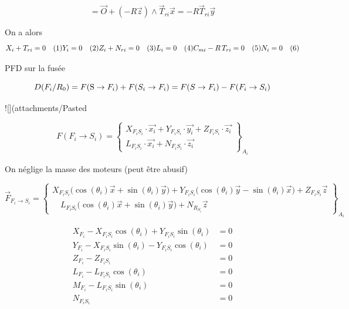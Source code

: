 \documentclass[a4paper,12pt]{report}  %
\begin{document}
$$ = \vec{O} + ({-R}\vec{z})\wedge\vec{T}_{ri}\vec{x} = -R\vec{T}_{ri}\vec{y}
$$

On a alors
$$
X_i + T_{ri} = 0 \quad (1) \\
Y_i = 0 \quad (2) \\
Z_i + N_{ri} = 0 \quad (3) \\
L_i = 0 \quad  (4) \\
C_{mi} - R\,T_{ri} = 0 \quad  (5) \\
N_i = 0 \quad  (6)
$$


PFD sur la fusée

$$
D(F_i/R_0) = {F}(\text{S}\rightarrow F_i) + {F}(S_i \rightarrow F_i) \\
= {F}(S \rightarrow F_i) - {F}(F_i \rightarrow S_i) \\
$$

![](attachments/Pasted%

$$
F(F_i \to S_i) = 
\begin{Bmatrix}
	X_{F_i S_i} \cdot \vec{x_i} + Y_{F_i S_i} \cdot \vec{y_i} + Z_{F_i S_i} \cdot \vec{z_i} \\
	L_{F_i S_i} \cdot \vec{x_i} + N_{F_i S_i} \cdot \vec{z_i}
\end{Bmatrix}_{A_{i}}
$$




On néglige la masse des moteurs (peut être abusif)


$$
\vec{F}_{F_i \to S_i} =
\left\{
\begin{array}{c}
	X_{F_iS_i} \big(\cos(\theta_i) \vec{x} + \sin(\theta_i) \vec{y} \big) 
	+  Y_{F_iS_i} \big(\cos(\theta_i) \vec{y} - \sin(\theta_i) \vec{x} \big)
	+ Z_{F_iS_i} \vec{z} \\[1em]
	\quad L_{F_iS_i} \big(\cos(\theta_i) \vec{x} + \sin(\theta_i) \vec{y} \big)  + N_{R_{S_i}} \vec{z}
\end{array}
\right\}_{A_i}
$$


\begin{align}
	X_{F_i} - X_{F_iS_i} \cos(\theta_i) + Y_{F_iS_i} \sin(\theta_i) &= 0 \tag{7} \\
	Y_{F_i} - X_{F_iS_i} \sin(\theta_i) - Y_{F_iS_i} \cos(\theta_i) &= 0 \tag{8} \\
	Z_{F_i} - Z_{F_iS_i} &= 0 \tag{9} \\
	L_{F_i} - L_{F_iS_i} \cos(\theta_i) &= 0 \tag{10} \\
	M_{F_i} - L_{F_iS_i} \sin(\theta_i) &= 0 \tag{11} \\
	N_{F_iS_i} &= 0 \tag{12}
\end{align}
\end{document}

